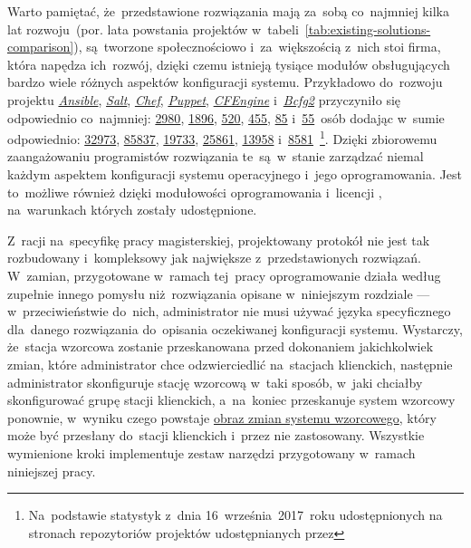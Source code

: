 \documentclass[thesis]{subfiles}
\begin{document}
Warto pamiętać, że~przedstawione rozwiązania mają za~sobą co~najmniej kilka lat rozwoju~(por. lata powstania projektów w~tabeli~\ref{tab:existing-solutions-comparison}), są~tworzone społecznościowo i~za~większością z~nich stoi firma, która napędza ich~rozwój, dzięki czemu istnieją tysiące modułów obsługujących bardzo wiele różnych aspektów konfiguracji systemu. Przykładowo do~rozwoju projektu \emph{\hyperref[sec:ansible]{Ansible}}, \emph{\hyperref[sec:salt]{Salt}}, \emph{\hyperref[sec:chef]{Chef}}, \emph{\hyperref[sec:puppet]{Puppet}}, \emph{\hyperref[itm:cfengine]{CFEngine}} i~\emph{\hyperref[itm:bcfg2]{Bcfg2}} przyczyniło się odpowiednio co~najmniej: \href{https://github.com/ansible/ansible}{2980}, \href{https://github.com/saltstack/salt}{1896}, \href{https://github.com/chef/chef}{520}, \href{https://github.com/puppetlabs/puppet}{455}, \href{https://github.com/cfengine/core}{85} i~\href{https://github.com/Bcfg2/bcfg2}{55}~osób dodając w~sumie odpowiednio: \href{https://github.com/ansible/ansible}{32973}, \href{https://github.com/saltstack/salt}{85837}, \href{https://github.com/chef/chef}{19733}, \href{https://github.com/puppetlabs/puppet}{25861}, \href{https://github.com/cfengine/core}{13958} i~\href{https://github.com/Bcfg2/bcfg2}{8581}~\footnote{Na~podstawie statystyk z~dnia 16~września~2017~roku udostępnionych na stronach repozytoriów projektów udostępnianych przez }. Dzięki zbiorowemu zaangażowaniu programistów rozwiązania te~są~w~stanie zarządzać niemal każdym aspektem konfiguracji systemu operacyjnego i~jego oprogramowania. Jest to~możliwe również dzięki modułowości oprogramowania i~licencji , na~warunkach których zostały udostępnione.


Z~racji na~specyfikę pracy magisterskiej, projektowany protokół nie jest tak rozbudowany i~kompleksowy jak największe z~przedstawionych rozwiązań. W~zamian, przygotowane w~ramach tej~pracy oprogramowanie działa według zupełnie innego pomysłu niż~rozwiązania opisane w~niniejszym rozdziale --- w~przeciwieństwie do~nich, administrator nie musi używać języka specyficznego dla~danego rozwiązania do~opisania oczekiwanej konfiguracji systemu. Wystarczy, że~stacja wzorcowa zostanie przeskanowana przed dokonaniem jakichkolwiek zmian, które administrator chce odzwierciedlić na~stacjach klienckich, następnie administrator skonfiguruje stację wzorcową w~taki sposób, w~jaki chciałby skonfigurować grupę stacji klienckich, a~na~koniec przeskanuje system wzorcowy ponownie, w~wyniku czego powstaje \hyperref[sec:obraz-zmian-konfiguracji]{obraz zmian systemu wzorcowego}, który może być przesłany do~stacji klienckich i~przez nie zastosowany. Wszystkie wymienione kroki implementuje zestaw narzędzi przygotowany w~ramach niniejszej pracy.
\end{document}
